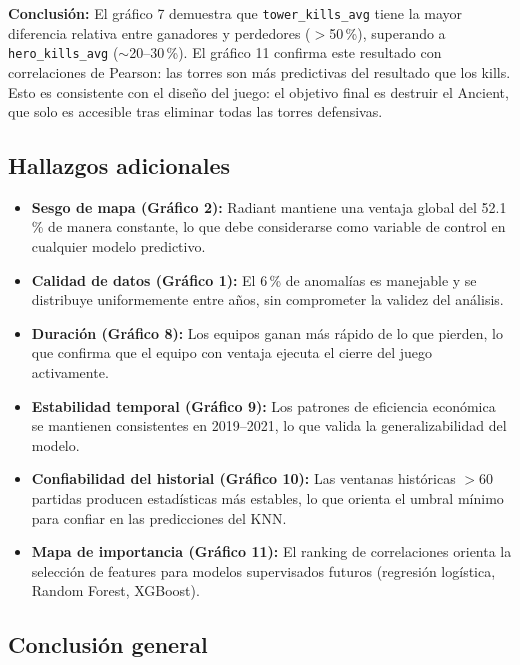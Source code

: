 \documentclass[12pt,a4paper]{article}
\begin{document}
\textbf{Conclusi\'on:} El gr\'afico 7 demuestra que \texttt{tower\_kills\_avg}
tiene la mayor diferencia relativa entre ganadores y perdedores ($>$50\,\%),
superando a \texttt{hero\_kills\_avg} ($\sim$20--30\,\%). El gr\'afico 11 confirma
este resultado con correlaciones de Pearson: las torres son m\'as predictivas del
resultado que los kills. Esto es consistente con el dise\~no del juego: el objetivo
final es destruir el Ancient, que solo es accesible tras eliminar todas las torres
defensivas.

\subsection*{Hallazgos adicionales}

\begin{itemize}
  \item \textbf{Sesgo de mapa (Gr\'afico 2):} Radiant mantiene una ventaja global
        del 52.1\,\% de manera constante, lo que debe considerarse como variable
        de control en cualquier modelo predictivo.
  \item \textbf{Calidad de datos (Gr\'afico 1):} El 6\,\% de anomal\'ias es
        manejable y se distribuye uniformemente entre a\~nos, sin comprometer la
        validez del an\'alisis.
  \item \textbf{Duraci\'on (Gr\'afico 8):} Los equipos ganan m\'as r\'apido de
        lo que pierden, lo que confirma que el equipo con ventaja ejecuta el cierre
        del juego activamente.
  \item \textbf{Estabilidad temporal (Gr\'afico 9):} Los patrones de eficiencia
        econ\'omica se mantienen consistentes en 2019--2021, lo que valida
        la generalizabilidad del modelo.
  \item \textbf{Confiabilidad del historial (Gr\'afico 10):} Las ventanas
        hist\'oricas $>$60 partidas producen estad\'isticas m\'as estables,
        lo que orienta el umbral m\'inimo para confiar en las predicciones del KNN.
  \item \textbf{Mapa de importancia (Gr\'afico 11):} El ranking de correlaciones
        orienta la selecci\'on de features para modelos supervisados futuros
        (regresi\'on log\'istica, Random Forest, XGBoost).
\end{itemize}

\subsection*{Conclusi\'on general}
\end{document}
